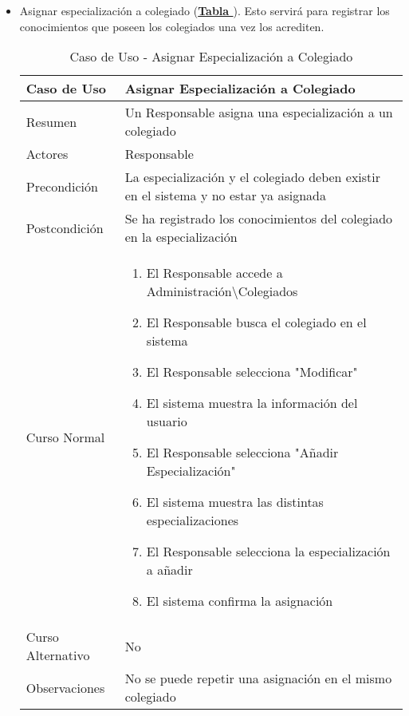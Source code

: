 \begin{itemize}
	\item \addtocounter{tabla}{1} Asignar especialización a colegiado (\textbf{\hyperref[tab:curAsignarEspecColeg]{Tabla }}). Esto servirá para registrar los conocimientos que poseen los colegiados una vez los acrediten.
		\begin{table}[!htbp]
		  \centering  \addtocounter{casouso}{1}
		  \begin{tabular}{|l | p{100mm}|}
		    \textbf{Caso de Uso}  & \textbf{Asignar Especialización a Colegiado} \\ \hline
		    Resumen 		 & Un Responsable asigna una especialización a un colegiado \\ \hline
		    Actores  		 & Responsable \\ \hline
		    Precondición  	 & La especialización y el colegiado deben existir en el sistema y no estar ya asignada  \\ \hline
		    Postcondición  	 & Se ha registrado los conocimientos del colegiado en la especialización \\ \hline
		    Curso Normal   	 & \begin{enumerate}
			  \item El Responsable accede a Administración\textbackslash Colegiados
			  \item El Responsable busca el colegiado en el sistema
			  \item El Responsable selecciona "Modificar"
			  \item El sistema muestra la información del usuario
			  \item El Responsable selecciona "Añadir Especialización"
			  \item El sistema muestra las distintas especializaciones
			  \item El Responsable selecciona la especialización a añadir
			  \item El sistema confirma la asignación
		    \end{enumerate}  \\ \hline
		    Curso Alternativo  & No  \\ \hline
		    Observaciones 	 & No se puede repetir una asignación en el mismo colegiado  \\ \hline
		  \end{tabular}
		  \caption{Caso de Uso  - Asignar Especialización a Colegiado}
		  \label{tab:curAsignarEspecColeg}
		\end{table}
		\FloatBarrier
		

\end{itemize}
